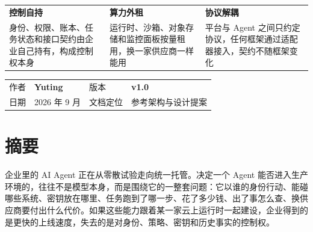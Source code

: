 \begin{titlepage}
  \vspace{1.5cm}

  \noindent
  \begin{tabularx}{\textwidth}{@{}YYY@{}}
    {\sffamily\bfseries\color{PrimaryDark}控制自持} &
    {\sffamily\bfseries\color{PrimaryDark}算力外租} &
    {\sffamily\bfseries\color{PrimaryDark}协议解耦}\\[0.2em]
    {\small\color{BodyText}身份、权限、账本、任务状态和接口契约由企业自己持有，构成控制权本身} &
    {\small\color{BodyText}运行时、沙箱、对象存储和监控面板按量租用，换一家供应商一样能用} &
    {\small\color{BodyText}平台与 Agent 之间只约定协议，任何框架通过适配器接入，契约不随框架变化}
  \end{tabularx}

  \vfill

  \noindent{\color{Rule}\rule{\textwidth}{0.6pt}}\par
  \vspace{0.55cm}
  \noindent
  \begin{tabularx}{\textwidth}{@{}L{2.4cm}L{6.2cm}L{2.0cm}Y@{}}
    {\sffamily\small\color{Muted}作者} & {\sffamily\bfseries\color{Ink}Yuting} &
    {\sffamily\small\color{Muted}版本} & {\sffamily\bfseries\color{Ink}v1.0}\\[0.35em]
    {\sffamily\small\color{Muted}日期} & {\sffamily\color{Ink}2026 年 9 月} &
    {\sffamily\small\color{Muted}文档定位} & {\sffamily\color{Ink}参考架构与设计提案}
  \end{tabularx}
  \vspace{0.45cm}

\end{titlepage}

\hypersetup{pageanchor=true}

\section*{摘要}

企业里的 AI Agent 正在从零散试验走向统一托管。决定一个 Agent 能否进入生产环境的，往往不是模型本身，而是围绕它的一整套问题：它以谁的身份行动、能碰哪些系统、密钥放在哪里、任务跑到了哪一步、花了多少钱、出了事怎么查、换供应商要付出什么代价。如果这些能力跟着某一家云上运行时一起建设，企业得到的是更快的上线速度，失去的是对身份、策略、密钥和历史事实的控制权。

